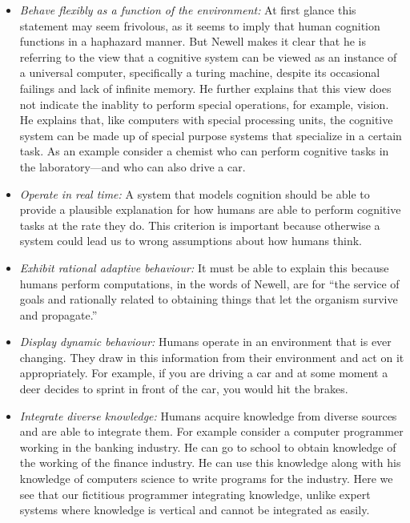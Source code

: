 \begin{itemize} 


\item {\em Behave flexibly as a function of the environment:} At first
  glance this statement may seem frivolous, as it seems to imply that
  human cognition functions in a haphazard manner. But Newell makes it
  clear that he is referring to the view that a cognitive system can
  be viewed as an instance of a universal computer, specifically a
  turing machine, despite its occasional failings and lack of infinite
  memory. He further explains that this view does not indicate the
  inablity to perform special operations, for example, vision. He
  explains that, like computers with special processing units, the
  cognitive system can be made up of special purpose systems that
  specialize in a certain task. As an example consider a chemist who
  can perform cognitive tasks in the laboratory---and who can also
  drive a car.

\item {\em Operate in real time:} A system that models cognition
  should be able to provide a plausible explanation for how humans are
  able to perform cognitive tasks at the rate they do. This criterion
  is important because otherwise a system could lead us to wrong
  assumptions about how humans think.

\item {\em Exhibit rational adaptive behaviour:} It must be able to
  explain this because humans perform computations, in the words of
  Newell\cite{Newell:1990aa}, are for ``the service of goals and
  rationally related to obtaining things that let the organism survive
  and propagate.''

\item {\em Display dynamic behaviour:} Humans operate in an
  environment that is ever changing. They draw in this information
  from their environment and act on it appropriately. For example, if
  you are driving a car and at some moment a deer decides to sprint in
  front of the car, you would hit the brakes.

\item {\em Integrate diverse knowledge:} Humans acquire knowledge from
diverse sources and are able to integrate them. For example consider a
computer programmer working in the banking industry. He can go to
school to obtain knowledge of the working of the finance industry. He
can use this knowledge along with his knowledge of computers science
to write programs for the industry. Here we see that our fictitious
programmer integrating knowledge, unlike expert systems where
knowledge is vertical and cannot be integrated as easily.


\end{itemize}
